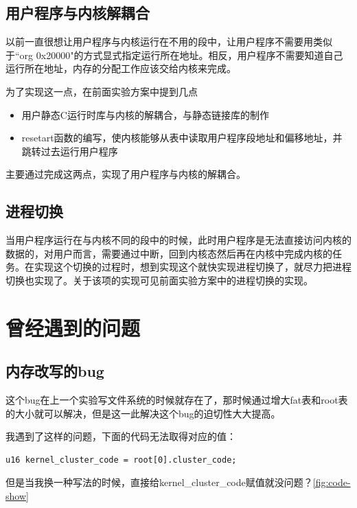 \documentclass[forprint]{WHUBachelor}
\begin{document}
\section{用户程序与内核解耦合}

以前一直很想让用户程序与内核运行在不用的段中，让用户程序不需要用类似于“org 0x20000"的方式显式指定运行所在地址。相反，用户程序不需要知道自己运行所在地址，内存的分配工作应该交给内核来完成。

为了实现这一点，在前面实验方案中提到几点

\begin{itemize}
  \item 用户静态C运行时库与内核的解耦合，与静态链接库的制作
  \item resetart函数的编写，使内核能够从表中读取用户程序段地址和偏移地址，并跳转过去运行用户程序
\end{itemize}

主要通过完成这两点，实现了用户程序与内核的解耦合。

\section{进程切换}

当用户程序运行在与内核不同的段中的时候，此时用户程序是无法直接访问内核的数据的，对用户而言，需要通过中断，回到内核态然后再在内核中完成内核的任务。在实现这个切换的过程时，想到实现这个就快实现进程切换了，就尽力把进程切换也实现了。关于该项的实现可见前面实验方案中的进程切换的实现。

\chapter{曾经遇到的问题}

\section{内存改写的bug}

这个bug在上一个实验写文件系统的时候就存在了，那时候通过增大fat表和root表的大小就可以解决，但是这一此解决这个bug的迫切性大大提高。

我遇到了这样的问题，下面的代码无法取得对应的值：

\begin{lstlisting}[language={[x86masm]Assembler}]
  u16 kernel_cluster_code = root[0].cluster_code;
\end{lstlisting}

但是当我换一种写法的时候，直接给kernel\_cluster\_code赋值就没问题？\autoref{fig:code-show}
\end{document}
